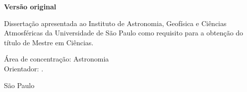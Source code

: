 
\thispagestyle{empty}%
\begin{center}
  \authorname

  \vspace{3cm}

  \textbf{\thesistitle}

  \vspace{3cm}

  \textbf{Versão original}

  \vspace{3cm}

  \begin{flushright}
    \begin{minipage}{.6\linewidth}
      Dissertação apresentada ao Instituto de Astronomia, \mbox{Geofísica} e Ciências Atmosféricas da Universidade de São Paulo como requisito para a obtenção do título de Mestre em \mbox{Ciências}.
      
      \vspace{0.5cm}
      
      Área de concentração: Astronomia
      \\
      Orientador: \supervisorname.
    \end{minipage}
  \end{flushright}
  \vfill
  
  São Paulo\\
  \the\year\\

\end{center}

\newpage
\shipout\null %

\restoregeometry %